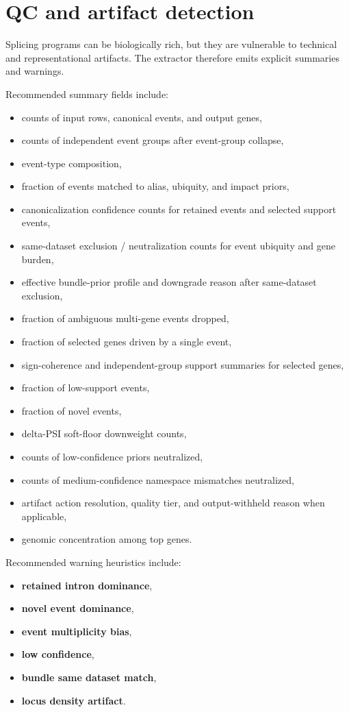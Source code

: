 \documentclass[11pt]{article}
\begin{document}
\section{QC and artifact detection}
Splicing programs can be biologically rich, but they are vulnerable to technical and representational artifacts. The extractor therefore emits explicit summaries and warnings.

Recommended summary fields include:
\begin{itemize}[leftmargin=2em]
\item counts of input rows, canonical events, and output genes,
\item counts of independent event groups after event-group collapse,
\item event-type composition,
\item fraction of events matched to alias, ubiquity, and impact priors,
\item canonicalization confidence counts for retained events and selected support events,
\item same-dataset exclusion / neutralization counts for event ubiquity and gene burden,
\item effective bundle-prior profile and downgrade reason after same-dataset exclusion,
\item fraction of ambiguous multi-gene events dropped,
\item fraction of selected genes driven by a single event,
\item sign-coherence and independent-group support summaries for selected genes,
\item fraction of low-support events,
\item fraction of novel events,
\item delta-PSI soft-floor downweight counts,
\item counts of low-confidence priors neutralized,
\item counts of medium-confidence namespace mismatches neutralized,
\item artifact action resolution, quality tier, and output-withheld reason when applicable,
\item genomic concentration among top genes.
\end{itemize}

Recommended warning heuristics include:
\begin{itemize}[leftmargin=2em]
\item \textbf{retained intron dominance},
\item \textbf{novel event dominance},
\item \textbf{event multiplicity bias},
\item \textbf{low confidence},
\item \textbf{bundle same dataset match},
\item \textbf{locus density artifact}.
\end{itemize}
\end{document}
